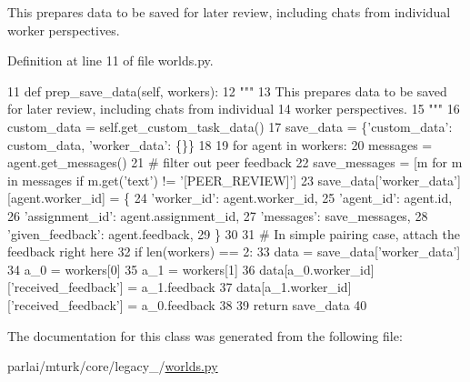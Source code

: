 \begin{DoxyVerb}This prepares data to be saved for later review, including chats from individual
worker perspectives.
\end{DoxyVerb}
 

Definition at line 11 of file worlds.\+py.


\begin{DoxyCode}
11     \textcolor{keyword}{def }prep\_save\_data(self, workers):
12         \textcolor{stringliteral}{"""}
13 \textcolor{stringliteral}{        This prepares data to be saved for later review, including chats from individual}
14 \textcolor{stringliteral}{        worker perspectives.}
15 \textcolor{stringliteral}{        """}
16         custom\_data = self.get\_custom\_task\_data()
17         save\_data = \{\textcolor{stringliteral}{'custom\_data'}: custom\_data, \textcolor{stringliteral}{'worker\_data'}: \{\}\}
18 
19         \textcolor{keywordflow}{for} agent \textcolor{keywordflow}{in} workers:
20             messages = agent.get\_messages()
21             \textcolor{comment}{# filter out peer feedback}
22             save\_messages = [m \textcolor{keywordflow}{for} m \textcolor{keywordflow}{in} messages \textcolor{keywordflow}{if} m.get(\textcolor{stringliteral}{'text'}) != \textcolor{stringliteral}{'[PEER\_REVIEW]'}]
23             save\_data[\textcolor{stringliteral}{'worker\_data'}][agent.worker\_id] = \{
24                 \textcolor{stringliteral}{'worker\_id'}: agent.worker\_id,
25                 \textcolor{stringliteral}{'agent\_id'}: agent.id,
26                 \textcolor{stringliteral}{'assignment\_id'}: agent.assignment\_id,
27                 \textcolor{stringliteral}{'messages'}: save\_messages,
28                 \textcolor{stringliteral}{'given\_feedback'}: agent.feedback,
29             \}
30 
31         \textcolor{comment}{# In simple pairing case, attach the feedback right here}
32         \textcolor{keywordflow}{if} len(workers) == 2:
33             data = save\_data[\textcolor{stringliteral}{'worker\_data'}]
34             a\_0 = workers[0]
35             a\_1 = workers[1]
36             data[a\_0.worker\_id][\textcolor{stringliteral}{'received\_feedback'}] = a\_1.feedback
37             data[a\_1.worker\_id][\textcolor{stringliteral}{'received\_feedback'}] = a\_0.feedback
38 
39         \textcolor{keywordflow}{return} save\_data
40 
\end{DoxyCode}


The documentation for this class was generated from the following file\+:\begin{DoxyCompactItemize}
\item 
parlai/mturk/core/legacy\+\_/\hyperlink{parlai_2mturk_2core_2legacy__2018_2worlds_8py}{worlds.\+py}\end{DoxyCompactItemize}
